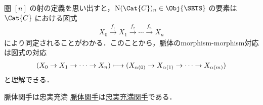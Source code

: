 \documentclass[TQFT_main]{subfiles}
\begin{document}
圏 $[n]$ の射の定義を思い出すと，$\mathrm{N}(\Cat{C})_n \in \Obj{\SETS}$ の要素は $\Cat{C}$ における図式
\begin{align}
    \label{eq:nerve-spine}
    X_0 \xrightarrow{f_1} X_1 \xrightarrow{f_2} \cdots \xrightarrow{f_n} X_n
\end{align}
により同定されることがわかる．このことから，脈体のmorphism-morphism対応は図式の対応
\begin{align}
    (X_0 \to X_1 \to \cdots \to X_n) \longmapsto (X_{\alpha(0)} \to X_{\alpha(1)} \to \cdots \to X_{\alpha(m)})
\end{align}
と理解できる．

\begin{myprop}[label=def:nerve]{脈体関手は忠実充満}
    \hyperref[def:nerve]{脈体関手}は\hyperref[def:faithful]{忠実充満関手}である．
\end{myprop}
\end{document}
